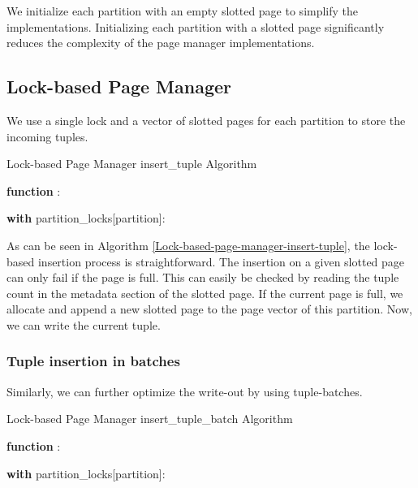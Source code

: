 We initialize each partition with an empty slotted page to simplify the implementations.
Initializing each partition with a slotted page significantly reduces the complexity of the page manager implementations.

\subsection{Lock-based Page Manager}
We use a single lock and a vector of slotted pages for each partition to store the incoming tuples.
\begin{algorithm}[h]
  \caption{Lock-based Page Manager insert\_tuple Algorithm}
  \label{Lock-based-page-manager-insert-tuple}



  \textbf{function} :

  \textbf{with} partition\_locks[partition]:
\end{algorithm}

As can be seen in Algorithm \ref{Lock-based-page-manager-insert-tuple}, the lock-based insertion process is straightforward.
The insertion on a given slotted page can only fail if the page is full.
This can easily be checked by reading the tuple count in the metadata section of the slotted page.
If the current page is full, we allocate and append a new slotted page to the page vector of this partition.
Now, we can write the current tuple.

\subsubsection*{Tuple insertion in batches}
Similarly, we can further optimize the write-out by using tuple-batches.
\begin{algorithm}[h]
  \caption{Lock-based Page Manager insert\_tuple\_batch Algorithm}
  \label{Lock-based-page-manager-insert-tuple-batch}



  \textbf{function} :

  \textbf{with} partition\_locks[partition]:
\end{algorithm}

